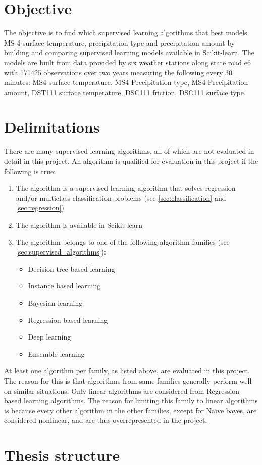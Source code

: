 

\section{Objective}
	The objective is to find which supervised learning algorithms that best models MS-4 surface temperature, precipitation type and precipitation amount by building and comparing supervised learning models available in Scikit-learn. The models are built from data provided by six weather stations along state road e6 with 171425 observations over two years measuring the following every 30 minutes: MS4 surface temperature, MS4 Precipitation type, MS4 Precipitation amount, DST111 surface temperature, DSC111 friction, DSC111 surface type.  %

\section{Delimitations} \label{sec:delimitations}
	There are many supervised learning algorithms, all of which are not evaluated in detail in this project. An algorithm is qualified for evaluation in this project if the following is true:
	\begin{enumerate}
		\item The algorithm is a supervised learning algorithm that solves regression and/or multiclass classification problems (see \ref{sec:classification} and \ref{sec:regression})
		\item The algorithm is available in Scikit-learn \cite{WEBSITE:15}
		\item The algorithm belongs to one of the following algorithm families (see \ref{sec:supervised_algorithms}):
			\begin{itemize}
				\item Decision tree based learning %
				\item Instance based learning %
				\item Bayesian learning %
				\item Regression based learning %
				\item Deep learning %
				\item Ensemble learning %
			\end{itemize}
	\end{enumerate}
	At least one algorithm per family, as listed above, are evaluated in this project. The reason for this is that algorithms from same families generally perform well on similar situations. %
Only linear algorithms are considered from Regression based learning algorithms. The reason for limiting this family to linear algorithms is because every other algorithm in the other families, except for Naïve bayes, are considered nonlinear, and are thus overrepresented in the project. 
	
\section{Thesis structure}
